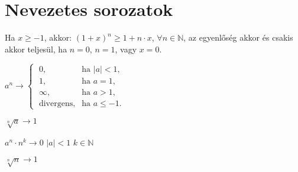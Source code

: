\section{Nevezetes sorozatok}

\begin{theorem}
  Ha $x \geq -1$, akkor: $(1 + x)^n \geq 1 + n \cdot x$, $\forall n \in
    \mathbb N$, az egyenlőség akkor és csakis akkor teljesül, ha $n = 0$,
  $n = 1$, vagy $x = 0$.
\end{theorem}

\begin{blueBox}
  $
    a^n \rightarrow \begin{cases}
      \;0,                & \text{ha } |a| < 1,   \\
      \;1,                & \text{ha } a = 1,     \\
      \;\infty,           & \text{ha } a > 1,     \\
      \;\text{divergens}, & \text{ha } a \leq -1.
    \end{cases}
  $

  \hdashrule[.8ex][x]{\dimexpr\textwidth}{1pt}{2mm 3pt}
  \phantom{alma}\vspace{10cm}\phantom{alma}




\end{blueBox}

\begin{blueBox}
  $
    \sqrt[n]{a} \rightarrow 1
  $

  \hdashrule[.8ex][x]{\dimexpr\textwidth}{1pt}{2mm 3pt}
  \phantom{alma}\vspace{9.5cm}\phantom{alma}
\end{blueBox}

\begin{blueBox}
  $
    a^n \cdot n^k \rightarrow 0$
  $|a|<1$
  $k \in \mathbb N
  $

  \hdashrule[.8ex][x]{\dimexpr\textwidth}{1pt}{2mm 3pt}
  \phantom{alma}\vspace{9.5cm}\phantom{alma}
\end{blueBox}

\begin{blueBox}
  $
    \sqrt[n]{n} \rightarrow 1
  $

  \hdashrule[.8ex][x]{\dimexpr\textwidth}{1pt}{2mm 3pt}
  \phantom{alma}\vspace{9.5cm}\phantom{alma}
\end{blueBox}

